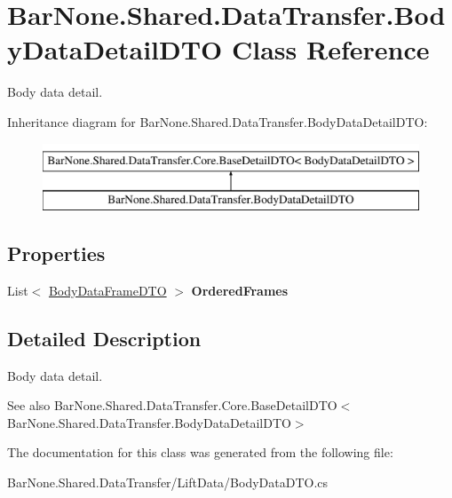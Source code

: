 \hypertarget{class_bar_none_1_1_shared_1_1_data_transfer_1_1_body_data_detail_d_t_o}{}\section{Bar\+None.\+Shared.\+Data\+Transfer.\+Body\+Data\+Detail\+D\+TO Class Reference}
\label{class_bar_none_1_1_shared_1_1_data_transfer_1_1_body_data_detail_d_t_o}


Body data detail.  


Inheritance diagram for Bar\+None.\+Shared.\+Data\+Transfer.\+Body\+Data\+Detail\+D\+TO\+:\begin{figure}[H]
\begin{center}
\leavevmode
\includegraphics[height=2.000000cm]{class_bar_none_1_1_shared_1_1_data_transfer_1_1_body_data_detail_d_t_o}
\end{center}
\end{figure}
\subsection*{Properties}
\begin{DoxyCompactItemize}
\item 
\mbox{\label{class_bar_none_1_1_shared_1_1_data_transfer_1_1_body_data_detail_d_t_o_acf1e04e5b9e4d7c16f5dc60f36550a05}} 
List$<$ \mbox{\hyperlink{class_bar_none_1_1_shared_1_1_data_transfer_1_1_body_data_frame_d_t_o}{Body\+Data\+Frame\+D\+TO}} $>$ {\bfseries Ordered\+Frames}
\end{DoxyCompactItemize}


\subsection{Detailed Description}
Body data detail. 

\begin{DoxySeeAlso}{See also}
Bar\+None.\+Shared.\+Data\+Transfer.\+Core.\+Base\+Detail\+D\+T\+O$<$\+Bar\+None.\+Shared.\+Data\+Transfer.\+Body\+Data\+Detail\+D\+T\+O$>$


\end{DoxySeeAlso}


The documentation for this class was generated from the following file\+:\begin{DoxyCompactItemize}
\item 
Bar\+None.\+Shared.\+Data\+Transfer/\+Lift\+Data/Body\+Data\+D\+T\+O.\+cs\end{DoxyCompactItemize}
